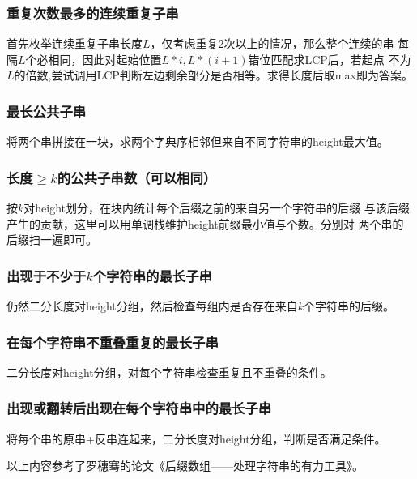 \subsubsection{重复次数最多的连续重复子串}
首先枚举连续重复子串长度$L$，仅考虑重复2次以上的情况，那么整个连续的串
每隔$L$个必相同，因此对起始位置$L*i,L*(i+1)$错位匹配求LCP后，若起点
不为$L$的倍数,尝试调用LCP判断左边剩余部分是否相等。求得长度后取max即为答案。
\subsubsection{最长公共子串}
将两个串拼接在一块，求两个字典序相邻但来自不同字符串的height最大值。
\subsubsection{长度$\geq k$的公共子串数（可以相同）}
按$k$对height划分，在块内统计每个后缀之前的来自另一个字符串的后缀
与该后缀产生的贡献，这里可以用单调栈维护height前缀最小值与个数。分别对
两个串的后缀扫一遍即可。
\subsubsection{出现于不少于$k$个字符串的最长子串}
仍然二分长度对height分组，然后检查每组内是否存在来自$k$个字符串的后缀。
\subsubsection{在每个字符串不重叠重复的最长子串}
二分长度对height分组，对每个字符串检查重复且不重叠的条件。
\subsubsection{出现或翻转后出现在每个字符串中的最长子串}
将每个串的原串+反串连起来，二分长度对height分组，判断是否满足条件。

以上内容参考了罗穗骞的论文《后缀数组——处理字符串的有力工具》。
